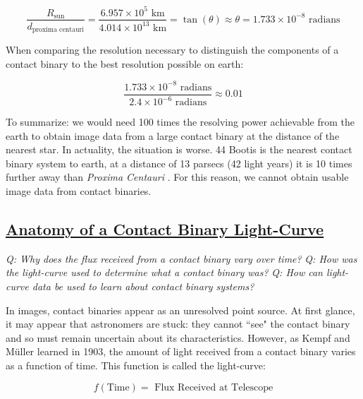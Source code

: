 \documentclass[12pt]{article} %
\numberwithin{equation}{section} %
\begin{document}
\begin{equation} \label{eqn: example_angle}
\frac{R_{\text{sun}}}{d_{\text{proxima centauri}}} = \frac{6.957 \times 10^{5} \text{ km}}{4.014 \times 10^{13} \text{ km}} = \tan(\theta) \approx \theta = 1.733 \times 10^{-8} \text{ radians}
\end{equation}

When comparing the resolution necessary to distinguish the components of a contact binary to the best resolution possible on earth:

\begin{equation} \label{eqn: resolution_comparison}
\frac{1.733 \times 10^{-8} \text{ radians}}{2.4 \times 10^{-6} \text{ radians}} \approx 0.01
\end{equation}

To summarize: we would need 100 times the resolving power achievable from the earth to obtain image data from a large contact binary at the distance of the nearest star. In actuality, the situation is worse. 44 Bootis is the nearest contact binary system to earth, at a distance of 13 parsecs (42 light years) it is 10 times further away than \emph{Proxima Centauri} \citep{eker2008new}. For this reason, we cannot obtain usable image data from contact binaries. 

\subsection[Anatomy of a Contact Binary Light-Curve]{\hyperlink{toc}{Anatomy of a Contact Binary Light-Curve}} \label{sec: Anatomy of a Contact Binary Light-Curve}

\emph{Q: Why does the flux received from a contact binary vary over time?}
\emph{Q: How was the light-curve used to determine what a contact binary was?}
\emph{Q: How can light-curve data be used to learn about contact binary systems? }

In images, contact binaries appear as an unresolved point source. At first glance, it may appear that astronomers are stuck: they cannot ``see" the contact binary and so must remain uncertain about its characteristics. However, as Kempf and M\"{u}ller learned in 1903, the amount of light received from a contact binary varies as a function of time. This function is called the light-curve: 

\begin{equation} \label{eqn: light_curve}
f(\text{Time}) = \text{ Flux Received at Telescope}
\end{equation}
\end{document}
